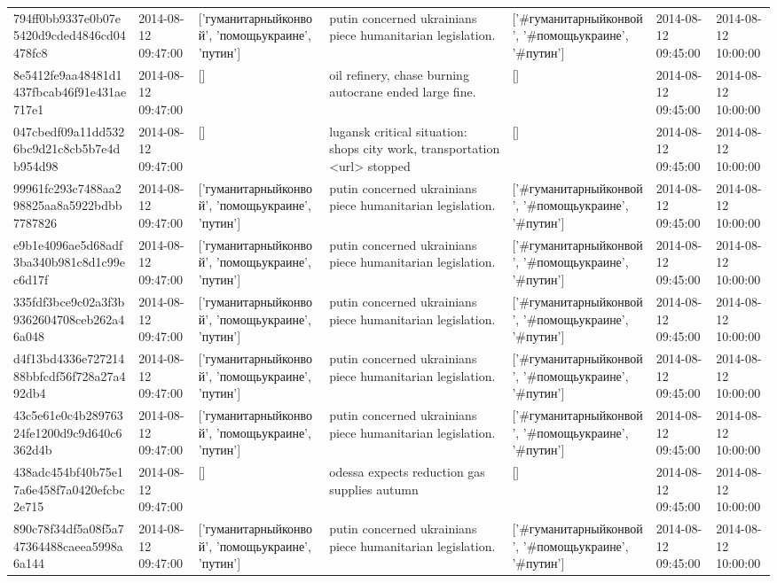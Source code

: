 \begin{tabular}{lllllll}
794ff0bb9337e0b07e5420d9cded4846cd04478fc8 & 2014-08-12 09:47:00 & ['гуманитарныйконвой', 'помощьукраине', 'путин'] & putin concerned ukrainians piece humanitarian legislation. & ['#гуманитарныйконвой', '#помощьукраине', '#путин'] & 2014-08-12 09:45:00 & 2014-08-12 10:00:00 \\
8e5412fe9aa48481d1437fbcab46f91e431ae717e1 & 2014-08-12 09:47:00 & [] & oil refinery, chase burning autocrane ended large fine. & [] & 2014-08-12 09:45:00 & 2014-08-12 10:00:00 \\
047cbedf09a11dd5326bc9d21c8cb5b7e4db954d98 & 2014-08-12 09:47:00 & [] & lugansk critical situation: shops city work, transportation <url> stopped & [] & 2014-08-12 09:45:00 & 2014-08-12 10:00:00 \\
99961fc293c7488aa298825aa8a5922bdbb7787826 & 2014-08-12 09:47:00 & ['гуманитарныйконвой', 'помощьукраине', 'путин'] & putin concerned ukrainians piece humanitarian legislation. & ['#гуманитарныйконвой', '#помощьукраине', '#путин'] & 2014-08-12 09:45:00 & 2014-08-12 10:00:00 \\
e9b1e4096ae5d68adf3ba340b981c8d1c99ec6d17f & 2014-08-12 09:47:00 & ['гуманитарныйконвой', 'помощьукраине', 'путин'] & putin concerned ukrainians piece humanitarian legislation. & ['#гуманитарныйконвой', '#помощьукраине', '#путин'] & 2014-08-12 09:45:00 & 2014-08-12 10:00:00 \\
335fdf3bce9c02a3f3b9362604708ceb262a46a048 & 2014-08-12 09:47:00 & ['гуманитарныйконвой', 'помощьукраине', 'путин'] & putin concerned ukrainians piece humanitarian legislation. & ['#гуманитарныйконвой', '#помощьукраине', '#путин'] & 2014-08-12 09:45:00 & 2014-08-12 10:00:00 \\
d4f13bd4336e72721488bbfcdf56f728a27a492db4 & 2014-08-12 09:47:00 & ['гуманитарныйконвой', 'помощьукраине', 'путин'] & putin concerned ukrainians piece humanitarian legislation. & ['#гуманитарныйконвой', '#помощьукраине', '#путин'] & 2014-08-12 09:45:00 & 2014-08-12 10:00:00 \\
43c5e61e0c4b28976324fe1200d9c9d640c6362d4b & 2014-08-12 09:47:00 & ['гуманитарныйконвой', 'помощьукраине', 'путин'] & putin concerned ukrainians piece humanitarian legislation. & ['#гуманитарныйконвой', '#помощьукраине', '#путин'] & 2014-08-12 09:45:00 & 2014-08-12 10:00:00 \\
438adc454bf40b75e17a6e458f7a0420efcbc2e715 & 2014-08-12 09:47:00 & [] & odessa expects reduction gas supplies autumn & [] & 2014-08-12 09:45:00 & 2014-08-12 10:00:00 \\
890c78f34df5a08f5a747364488caeea5998a6a144 & 2014-08-12 09:47:00 & ['гуманитарныйконвой', 'помощьукраине', 'путин'] & putin concerned ukrainians piece humanitarian legislation. & ['#гуманитарныйконвой', '#помощьукраине', '#путин'] & 2014-08-12 09:45:00 & 2014-08-12 10:00:00 \\

\end{tabular}
